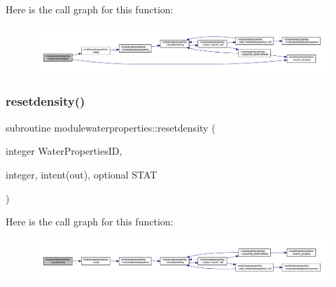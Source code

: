 Here is the call graph for this function\+:\nopagebreak
\begin{figure}[H]
\begin{center}
\leavevmode
\includegraphics[width=350pt]{namespacemodulewaterproperties_a09f49ce7e65baca37ff989dd6573e711_cgraph}
\end{center}
\end{figure}
\mbox{\label{namespacemodulewaterproperties_ac8f850628190d4096c329efc4d1880cc}} 
\subsubsection{\texorpdfstring{resetdensity()}{resetdensity()}}
{\footnotesize\ttfamily subroutine modulewaterproperties\+::resetdensity (\begin{DoxyParamCaption}\item[{integer}]{Water\+Properties\+ID,  }\item[{integer, intent(out), optional}]{S\+T\+AT }\end{DoxyParamCaption})\hspace{0.3cm}{\ttfamily [private]}}

Here is the call graph for this function\+:\nopagebreak
\begin{figure}[H]
\begin{center}
\leavevmode
\includegraphics[width=350pt]{namespacemodulewaterproperties_ac8f850628190d4096c329efc4d1880cc_cgraph}
\end{center}
\end{figure}
\mbox{\label{namespacemodulewaterproperties_abd63efefa04ded5606dbc3b60797d347}} 
